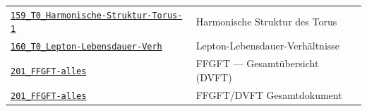 {\begin{longtable}{@{}>{\raggedright\arraybackslash}p{} >{\raggedright\arraybackslash}p{}@{}}
\href{https://github.com/jpascher/T0-Time-Mass-Duality/blob/main/2/pdf/159_T0_Harmonische-Struktur-Torus-1_De.pdf}{\texttt{159\_T0\_Harmonische-Struktur-Torus-1}} & Harmonische Struktur des Torus \\
\href{https://github.com/jpascher/T0-Time-Mass-Duality/blob/main/2/pdf/160_T0_Lepton-Lebensdauer-Verh_De.pdf}{\texttt{160\_T0\_Lepton-Lebensdauer-Verh}} & Lepton-Lebensdauer-Verhältnisse \\
\href{https://github.com/jpascher/T0-Time-Mass-Duality/blob/main/2/pdf/201_FFGFT-alles_De.pdf}{\texttt{201\_FFGFT-alles}} & FFGFT — Gesamtübersicht (DVFT) \\
\href{https://github.com/jpascher/T0-Time-Mass-Duality/blob/main/2/pdf/201_FFGFT-alles_De.pdf}{\texttt{201\_FFGFT-alles}} & FFGFT/DVFT Gesamtdokument \\
\end{longtable}
}